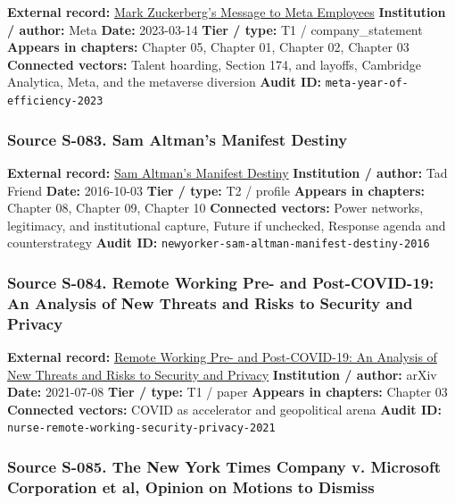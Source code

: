 \documentclass[
  american,
  11pt,
  letterpaper,
]{article}
\begin{document}
\textbf{External record:}
\href{https://about.fb.com/news/2023/03/mark-zuckerberg-meta-year-of-efficiency/}{Mark
Zuckerberg's Message to Meta Employees} \textbf{Institution / author:}
Meta \textbf{Date:} 2023-03-14 \textbf{Tier / type:} T1 /
company\_statement \textbf{Appears in chapters:} Chapter 05, Chapter 01,
Chapter 02, Chapter 03 \textbf{Connected vectors:} Talent hoarding,
Section 174, and layoffs, Cambridge Analytica, Meta, and the metaverse
diversion \textbf{Audit ID:} \texttt{meta-year-of-efficiency-2023}

\subsubsection{Source S-083. Sam Altman's Manifest
Destiny}\label{source-s-083-sam-altman-s-manifest-destiny}

\textbf{External record:}
\href{https://www.newyorker.com/magazine/2016/10/10/sam-altmans-manifest-destiny}{Sam
Altman's Manifest Destiny} \textbf{Institution / author:} Tad Friend
\textbf{Date:} 2016-10-03 \textbf{Tier / type:} T2 / profile
\textbf{Appears in chapters:} Chapter 08, Chapter 09, Chapter 10
\textbf{Connected vectors:} Power networks, legitimacy, and
institutional capture, Future if unchecked, Response agenda and
counterstrategy \textbf{Audit ID:}
\texttt{newyorker-sam-altman-manifest-destiny-2016}

\subsubsection{Source S-084. Remote Working Pre- and Post-COVID-19: An
Analysis of New Threats and Risks to Security and
Privacy}\label{source-s-084-remote-working-pre-and-post-covid-19-an-analysis-of-new-threats-and-risks-to-security-and-privacy}

\textbf{External record:} \href{https://arxiv.org/abs/2107.03907}{Remote
Working Pre- and Post-COVID-19: An Analysis of New Threats and Risks to
Security and Privacy} \textbf{Institution / author:} arXiv
\textbf{Date:} 2021-07-08 \textbf{Tier / type:} T1 / paper
\textbf{Appears in chapters:} Chapter 03 \textbf{Connected vectors:}
COVID as accelerator and geopolitical arena \textbf{Audit ID:}
\texttt{nurse-remote-working-security-privacy-2021}

\subsubsection{Source S-085. The New York Times Company v. Microsoft
Corporation et al, Opinion on Motions to
Dismiss}\label{source-s-085-the-new-york-times-company-v-microsoft-corporation-et-al-opinion-on-motions-to-dismiss}
\end{document}
